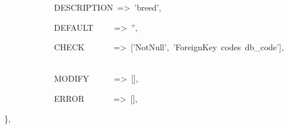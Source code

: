 \begin{table}[htbp]
\begin{lyxcode}
~{\scriptsize ~~~~~~~~~~~DESCRIPTION~=>~'breed',~~~~~~~~~~}{\scriptsize \par}

~{\scriptsize ~~~~~~~~~~~DEFAULT~~~~~=>~'',~~~~~~~~~~}{\scriptsize \par}

~{\scriptsize ~~~~~~~~~~~CHECK~~~~~~~=>~{[}'NotNull',~'ForeignKey~codes~db\_code'{]},~~~~~~~~~~}{\scriptsize \par}

~{\scriptsize ~~~~~~~~~~~MODIFY~~~~~~=>~{[}{]},~~~~~~~~~~}{\scriptsize \par}

~{\scriptsize ~~~~~~~~~~~ERROR~~~~~~~=>~{[}{]},~~~}{\scriptsize \par}

{\scriptsize \},~}\end{lyxcode}

\end{table}



